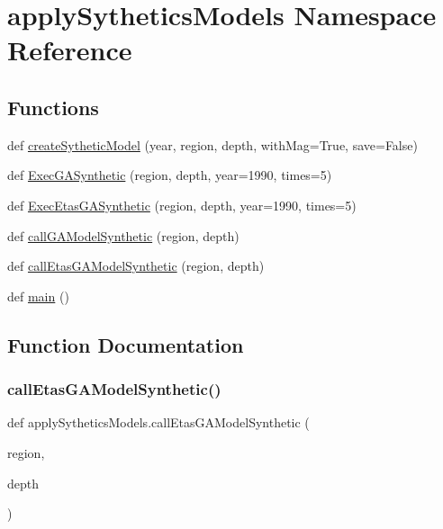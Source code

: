 \hypertarget{namespaceapply_sythetics_models}{}\section{apply\+Sythetics\+Models Namespace Reference}
\label{namespaceapply_sythetics_models}
\subsection*{Functions}
\begin{DoxyCompactItemize}
\item 
def \hyperlink{namespaceapply_sythetics_models_ae63bd6c91d8fe0ff3980de5fdd73e5aa}{create\+Sythetic\+Model} (year, region, depth, with\+Mag=True, save=False)
\item 
def \hyperlink{namespaceapply_sythetics_models_a2d73b275f7513fce9beb30dc8ff7d806}{Exec\+G\+A\+Synthetic} (region, depth, year=1990, times=5)
\item 
def \hyperlink{namespaceapply_sythetics_models_a6a5fa223090e2fa7094ec119c576f6eb}{Exec\+Etas\+G\+A\+Synthetic} (region, depth, year=1990, times=5)
\item 
def \hyperlink{namespaceapply_sythetics_models_a79233a58d0e9a42597d89513d2149454}{call\+G\+A\+Model\+Synthetic} (region, depth)
\item 
def \hyperlink{namespaceapply_sythetics_models_a939bc636ebda6554a521c6b59018b418}{call\+Etas\+G\+A\+Model\+Synthetic} (region, depth)
\item 
def \hyperlink{namespaceapply_sythetics_models_a17a91bec336ba8029a108e10c5c2fe56}{main} ()
\end{DoxyCompactItemize}


\subsection{Function Documentation}
\mbox{\label{namespaceapply_sythetics_models_a939bc636ebda6554a521c6b59018b418}} 
\subsubsection{\texorpdfstring{call\+Etas\+G\+A\+Model\+Synthetic()}{callEtasGAModelSynthetic()}}
{\footnotesize\ttfamily def apply\+Sythetics\+Models.\+call\+Etas\+G\+A\+Model\+Synthetic (\begin{DoxyParamCaption}\item[{}]{region,  }\item[{}]{depth }\end{DoxyParamCaption})}

